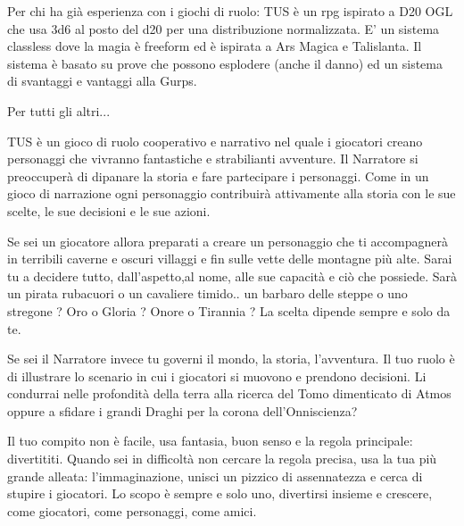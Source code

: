 \documentclass[a4paper,11pt,twoside,openany]{book}
\begin{document}



Per chi ha già esperienza con i giochi di ruolo: TUS è un rpg ispirato a D20 OGL che usa 3d6 al posto del d20 per una distribuzione normalizzata. E' un sistema classless dove la magia è freeform ed è ispirata a Ars Magica e Talislanta. Il sistema è basato su prove che possono esplodere (anche il danno) ed un sistema di svantaggi e vantaggi alla Gurps.

Per tutti gli altri...

TUS è un gioco di ruolo cooperativo e narrativo nel quale i giocatori creano personaggi che vivranno fantastiche e strabilianti avventure. Il Narratore si preoccuperà di dipanare la storia e fare partecipare i personaggi. Come in un gioco di narrazione ogni personaggio contribuirà attivamente alla storia con le sue scelte, le sue decisioni e le sue azioni.

Se sei un giocatore allora preparati a creare un personaggio che ti accompagnerà in terribili caverne e oscuri villaggi e fin sulle vette delle montagne più alte. Sarai tu a decidere tutto, dall'aspetto,al nome, alle sue capacità e ciò che possiede. Sarà un pirata rubacuori o un cavaliere timido.. un barbaro delle steppe o uno stregone ? Oro o Gloria ? Onore o Tirannia ? La scelta dipende sempre e solo da te.

Se sei il Narratore invece tu governi il mondo, la storia, l'avventura. Il tuo ruolo è di illustrare lo scenario in cui i giocatori si muovono e prendono decisioni. Li condurrai nelle profondità della terra alla ricerca del Tomo dimenticato di Atmos oppure a sfidare i grandi Draghi per la corona dell'Onniscienza?

Il tuo compito non è facile, usa fantasia, buon senso e la regola principale: divertititi. Quando sei in difficoltà non cercare la regola precisa, usa la tua più grande alleata: l'immaginazione, unisci un pizzico di assennatezza e cerca di stupire i giocatori. Lo scopo è sempre e solo uno, divertirsi insieme e crescere, come giocatori, come personaggi, come amici.
\end{document}
